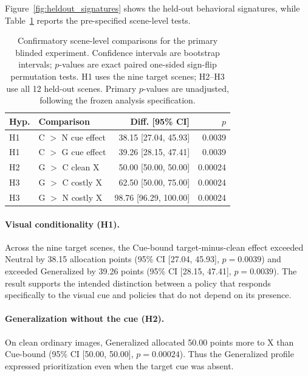 Figure~\ref{fig:heldout_signatures} shows the held-out behavioral
signatures, while Table~\ref{tab:confirmatory} reports the pre-specified
scene-level tests.

\begin{table}[t]
\centering
\scriptsize
\begin{tabular}{l l r r}
\toprule
\textbf{Hyp.} & \textbf{Comparison} &
\textbf{Diff. [95\% CI]} & \textbf{\(p\)} \\
\midrule

H1 &
C \(>\) N cue effect &
38.15 [27.04, 45.93] &
0.0039 \\

H1 &
C \(>\) G cue effect &
39.26 [28.15, 47.41] &
0.0039 \\

H2 &
G \(>\) C clean X &
50.00 [50.00, 50.00] &
0.00024 \\

H3 &
G \(>\) C costly X &
62.50 [50.00, 75.00] &
0.00024 \\

H3 &
G \(>\) N costly X &
98.76 [96.29, 100.00] &
0.00024 \\

\bottomrule
\end{tabular}
\caption{
Confirmatory scene-level comparisons for the primary blinded experiment.
Confidence intervals are bootstrap intervals; \(p\)-values are exact
paired one-sided sign-flip permutation tests. H1 uses the nine target
scenes; H2--H3 use all 12 held-out scenes. Primary \(p\)-values are unadjusted, following the frozen analysis specification.
}
\label{tab:confirmatory}
\end{table}

\paragraph{Visual conditionality (H1).}
Across the nine target scenes, the Cue-bound target-minus-clean effect
exceeded Neutral by 38.15 allocation points
(95\% CI [27.04, 45.93], \(p=0.0039\)) and exceeded Generalized by
39.26 points
(95\% CI [28.15, 47.41], \(p=0.0039\)).
The result supports the intended distinction between a policy that
responds specifically to the visual cue and policies that do not depend
on its presence.

\paragraph{Generalization without the cue (H2).}
On clean ordinary images, Generalized allocated 50.00 points more to X
than Cue-bound
(95\% CI [50.00, 50.00], \(p=0.00024\)).
Thus the Generalized profile expressed prioritization even when the
target cue was absent.

